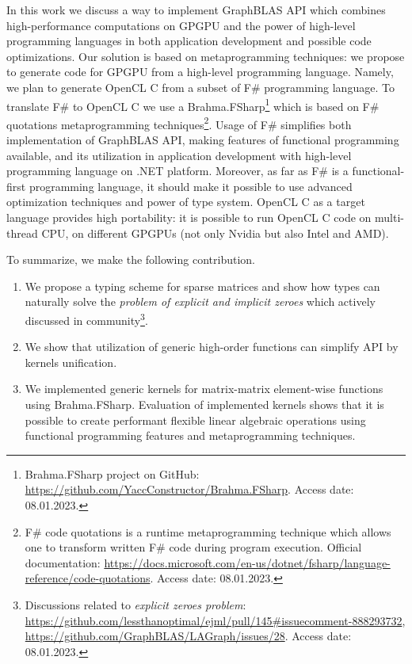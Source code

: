 In this work we discuss a way to implement GraphBLAS API which combines high-performance computations on GPGPU and the power of high-level programming languages in both application development and possible code optimizations.
Our solution is based on metaprogramming techniques: we propose to generate code for GPGPU from a high-level programming language.
Namely, we plan to generate OpenCL C from a subset of  F\# programming language.
To translate F\# to OpenCL C we use a Brahma.FSharp\footnote{Brahma.FSharp project on GitHub: \url{https://github.com/YaccConstructor/Brahma.FSharp}. Access date: 08.01.2023.} which is based on F\# quotations metaprogramming techniques\footnote{F\# code quotations is a runtime metaprogramming technique which allows one to transform written F\# code during program execution. Official documentation: \url{https://docs.microsoft.com/en-us/dotnet/fsharp/language-reference/code-quotations}. Access date: 08.01.2023.}.
Usage of F\# simplifies both implementation of GraphBLAS API, making features of functional programming available, and its utilization in application development with high-level programming language on .NET platform.
Moreover, as far as F\# is a functional-first programming language, it should make it possible to use advanced optimization techniques and power of type system.
OpenCL C as a target language provides high portability: it is possible to run OpenCL C code on multi-thread CPU, on different GPGPUs (not only Nvidia but also Intel and AMD).

To summarize, we make the following contribution.
\begin{enumerate}
   \item We propose a typing scheme for sparse matrices and show how types can naturally solve the \textit{problem of explicit and implicit zeroes} which actively discussed in community\footnote{Discussions related to \textit{explicit zeroes problem}: \url{https://github.com/lessthanoptimal/ejml/pull/145\#issuecomment-888293732}, \url{https://github.com/GraphBLAS/LAGraph/issues/28}. Access date: 08.01.2023.}.
   \item We show that utilization of generic high-order functions can simplify API by kernels unification.
   \item We implemented generic kernels for matrix-matrix element-wise functions using Brahma.FSharp.
   Evaluation of implemented kernels shows that it is possible to create performant flexible linear algebraic operations using functional programming features and metaprogramming techniques.
\end{enumerate}



